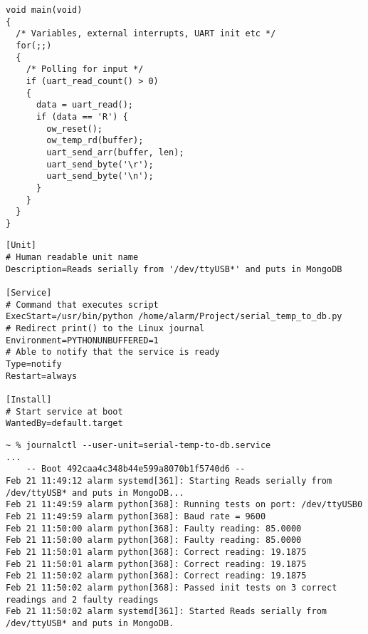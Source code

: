 \documentclass[aspectratio=169, 9pt]{uu-beamer}
\begin{document}

\begin{frame}[fragile]
    \begin{lstlisting}[caption={MCU program loop}, label={main}]
void main(void)
{
  /* Variables, external interrupts, UART init etc */
  for(;;)
  {
    /* Polling for input */
    if (uart_read_count() > 0)
    {
      data = uart_read();
      if (data == 'R') {
        ow_reset();
        ow_temp_rd(buffer);
        uart_send_arr(buffer, len);
        uart_send_byte('\r');
        uart_send_byte('\n');
      }
    }
  }
}
    \end{lstlisting}
\end{frame}

\begin{frame}[fragile]
\begin{lstlisting}[caption={The systemd service managing data collection}, label={systemd}]
[Unit]
# Human readable unit name
Description=Reads serially from '/dev/ttyUSB*' and puts in MongoDB

[Service]
# Command that executes script
ExecStart=/usr/bin/python /home/alarm/Project/serial_temp_to_db.py
# Redirect print() to the Linux journal
Environment=PYTHONUNBUFFERED=1
# Able to notify that the service is ready
Type=notify
Restart=always

[Install]
# Start service at boot
WantedBy=default.target
\end{lstlisting}
\end{frame}

\begin{frame}[fragile]
    \begin{lstlisting}[caption={Init tests logged in the journal}, label={journal}]
~ % journalctl --user-unit=serial-temp-to-db.service
...
    -- Boot 492caa4c348b44e599a8070b1f5740d6 --
Feb 21 11:49:12 alarm systemd[361]: Starting Reads serially from /dev/ttyUSB* and puts in MongoDB...
Feb 21 11:49:59 alarm python[368]: Running tests on port: /dev/ttyUSB0
Feb 21 11:49:59 alarm python[368]: Baud rate = 9600
Feb 21 11:50:00 alarm python[368]: Faulty reading: 85.0000
Feb 21 11:50:00 alarm python[368]: Faulty reading: 85.0000
Feb 21 11:50:01 alarm python[368]: Correct reading: 19.1875
Feb 21 11:50:01 alarm python[368]: Correct reading: 19.1875
Feb 21 11:50:02 alarm python[368]: Correct reading: 19.1875
Feb 21 11:50:02 alarm python[368]: Passed init tests on 3 correct readings and 2 faulty readings
Feb 21 11:50:02 alarm systemd[361]: Started Reads serially from /dev/ttyUSB* and puts in MongoDB.
    \end{lstlisting}
\end{frame}
\end{document}
